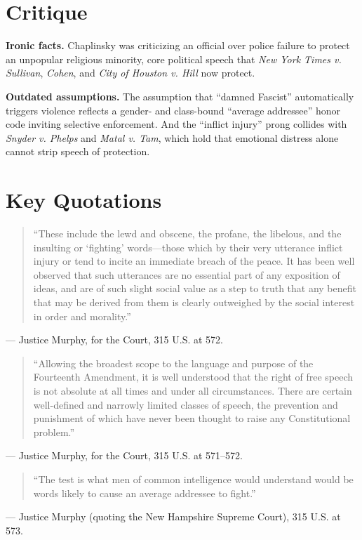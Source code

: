 \documentclass[12pt]{article}
\begin{document}
\section{Critique}

\textbf{Ironic facts.} Chaplinsky was criticizing an official over police failure to protect an unpopular religious minority, core political speech that \textit{New York Times v. Sullivan}, \textit{Cohen}, and \textit{City of Houston v. Hill} now protect.

\textbf{Outdated assumptions.} The assumption that ``damned Fascist'' automatically triggers violence reflects a gender- and class-bound ``average addressee'' honor code inviting selective enforcement. And the ``inflict injury'' prong collides with \textit{Snyder v. Phelps} and \textit{Matal v. Tam}, which hold that emotional distress alone cannot strip speech of protection.

\section{Key Quotations}

\begin{quote}
``These include the lewd and obscene, the profane, the libelous, and the insulting or `fighting' words---those which by their very utterance inflict injury or tend to incite an immediate breach of the peace. It has been well observed that such utterances are no essential part of any exposition of ideas, and are of such slight social value as a step to truth that any benefit that may be derived from them is clearly outweighed by the social interest in order and morality.''
\end{quote}
\noindent --- Justice Murphy, for the Court, 315 U.S. at 572.

\begin{quote}
``Allowing the broadest scope to the language and purpose of the Fourteenth Amendment, it is well understood that the right of free speech is not absolute at all times and under all circumstances. There are certain well-defined and narrowly limited classes of speech, the prevention and punishment of which have never been thought to raise any Constitutional problem.''
\end{quote}
\noindent --- Justice Murphy, for the Court, 315 U.S. at 571--572.

\begin{quote}
``The test is what men of common intelligence would understand would be words likely to cause an average addressee to fight.''
\end{quote}
\noindent --- Justice Murphy (quoting the New Hampshire Supreme Court), 315 U.S. at 573.
\end{document}
